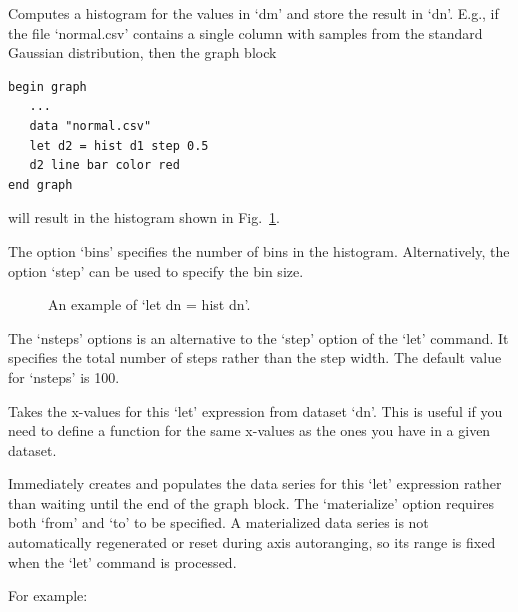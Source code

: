 \begin{commanddescription}
\item[{\sf let ds = hist dm [from {\it x1}] [to {\it x2}] [bins {\it n}] [step {\it n}]}]

Computes a histogram for the values in `dm' and store the result in `dn'. E.g., if the file `normal.csv' contains a single column with samples from the standard Gaussian distribution, then the graph block

\begin{Verbatim}
begin graph
   ...
   data "normal.csv"
   let d2 = hist d1 step 0.5
   d2 line bar color red
end graph
\end{Verbatim}

\noindent{}will result in the histogram shown in Fig.~\ref{hist:fig}.

The option `{\sf bins}' specifies the number of bins in the histogram. Alternatively, the option `{\sf step}' can be used to specify the bin size.

\begin{figure}[tb]
\centering
\mbox{}
\caption{\label{hist:fig}An example of `let dn = hist dn'.}
\end{figure}

\item[{\sf let ds = \ldots [nsteps {\it n}]}]

The `nsteps' options is an alternative to the `step' option of the `let' command. It specifies the total number of steps rather than the step width. The default value for `nsteps' is 100.

\item[{\sf let ds = \ldots [range {\it dn}]}]

Takes the x-values for this `let' expression from dataset `dn'. This is useful if you need to define a function for the same x-values as the ones you have in a given dataset.

\item[{\sf let ds = \ldots [materialize]}]

Immediately creates and populates the data series for this `let' expression rather than waiting until the end of the graph block. The `materialize' option requires both `from' and `to' to be specified. A materialized data series is not automatically regenerated or reset during axis autoranging, so its range is fixed when the `let' command is processed.

For example:


\end{commanddescription}
